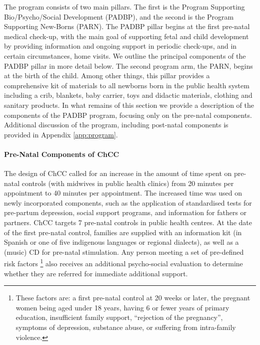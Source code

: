 \documentclass[12pt]{article}
\begin{document}
\begin{spacing}{1.4}
The program consists of two main pillars.  The first is the Program
Supporting Bio/Psycho/Social Development (PADBP), and the second
is the Program Supporting New-Borns (PARN).  The PADBP pillar begins
at the first pre-natal medical check-up, with the main goal of
supporting fetal and child development by providing information and
ongoing support in periodic check-ups, and in certain circumstances,
home visits.  We outline the principal components of the PADBP pillar
in more detail below.  The second program arm, the PARN, begins at the
birth of the child.  Among other things, this pillar provides a
comprehensive kit of materials to all newborns born in the public
health system including a crib, blankets, baby carrier, toys and
didactic materials, clothing and sanitary products.  In what remains
of this section we provide a description of the components of the PADBP
program, focusing only on the pre-natal components.  Additional
discussion of the program, including post-natal components is provided
in Appendix \ref{app:program}.

\paragraph{Pre-Natal Components of ChCC} The design of ChCC called for
an increase in the amount of time spent on pre-natal controls (with
midwives in public health clinics) from 20 minutes per appointment to
40 minutes per appointment.  The increased time was used on newly
incorporated components, such as the application of standardised
tests for pre-partum depression, social support programs, and information
for fathers or partners.  ChCC targets 7 pre-natal controls in public
health centres.  At the date of the first pre-natal control, families are
supplied with an information kit (in Spanish or one of five indigenous
languages or regional dialects), as well as a (music) CD for pre-natal
stimulation.  Any person meeting a set of pre-defined risk factors%
\footnote{These factors are: a first pre-natal control at 20 weeks or
  later, the pregnant women being aged under 18 years, having 6 or
  fewer years of primary education, insufficient family support,
  ``rejection of the pregnancy'', symptoms of depression, substance
abuse, or suffering from intra-family violence.} also
receives an additional psycho-social evaluation to determine whether
they are referred for immediate additional support.


\end{spacing}
\end{document}
